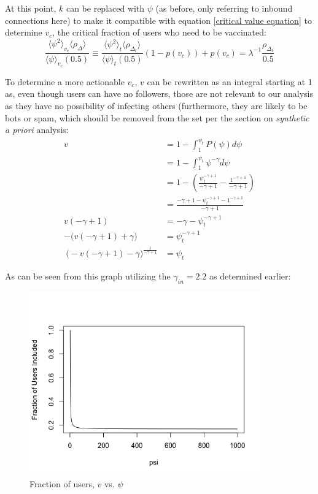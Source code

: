 \documentclass[NETN,manuscript]{stjour-new}
\begin{document}
At this point, $k$ can be replaced with $\psi$ (as before, only referring to inbound connections here) to make it compatible with equation \ref{critical value equation} to determine $v_c$, the critical fraction of users who need to be vaccinated:
\begin{equation}
\label{v_c equation}
 \frac{\langle \psi^2 \rangle_{v_c}\langle\rho_{\Delta}\rangle}{\langle \psi \rangle_{v_c}(0.5)} \equiv \frac{\langle \psi^2 \rangle_{t}\langle\rho_{\Delta_t}\rangle}{\langle \psi \rangle_{t}(0.5)}(1-p(v_c))+p(v_c)=\lambda^{-1}\frac{\rho_{\Delta_t}}{0.5}
\end{equation}

To determine a more actionable $v_c$, $v$ can be rewritten as an integral starting at 1 as, even though users can have no followers, those are not relevant to our analysis as they have no possibility of infecting others (furthermore, they are likely to be bots or spam, which should be removed from the set per the section on \textit{synthetic a priori} analysis:
\begin{equation}
\begin{split}
    v & = 1 - \int_1^{\psi_{t}} P(\psi)d\psi \\
    & = 1 - \int_1^{\psi_{t}} \psi^{-\gamma}d\psi \\
    & = 1 - \left(\frac{\psi_{t}^{-\gamma +1}}{-\gamma+1}-\frac{1^{-\gamma +1}}{-\gamma+1}\right) \\
    & = \frac{-\gamma+1 - \psi_{t}^{-\gamma +1} -  1^{-\gamma +1}}{-\gamma+1} \\
   v(-\gamma + 1) & = -\gamma - \psi_{t}^{-\gamma +1}\\
   -\big(v(-\gamma + 1) + \gamma\big) & = \psi_{t}^{-\gamma+1}\\\
   \big(-v(-\gamma + 1) - \gamma\big)^{\frac{1}{-\gamma + 1}} & = \psi_t
\end{split}
\end{equation}

As can be seen from this graph utilizing the $\gamma_{in} = 2.2$ as determined earlier:
\begin{figure}[h]
 \centering
  \includegraphics[width=10cm]{Fraction of users included.png}
  \caption{Fraction of users, $v$ vs. $\psi$}\label{fig:Fraction of users,v, vs. $\psi$}
 \end{figure}
\end{document}
